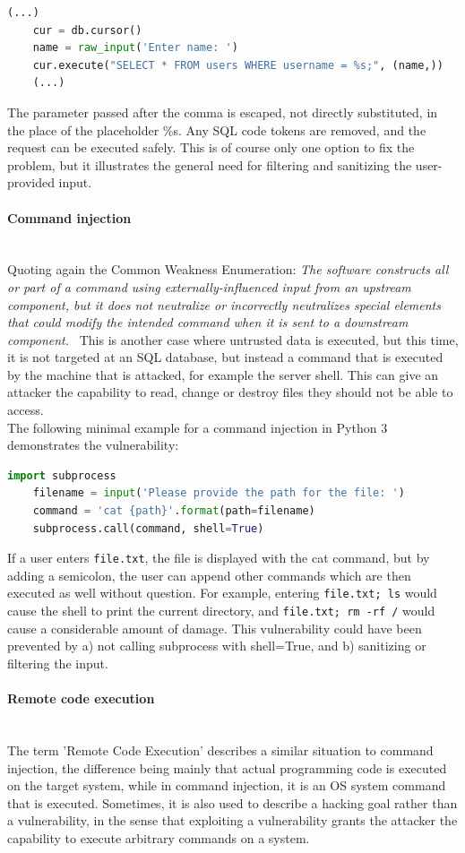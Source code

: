 \documentclass[
a4paper,
pagesize,
pdftex,
12pt,
twoside, %
BCOR=5mm, %
ngerman,
fleqn,
final,
]{scrartcl}
\begin{document}
	\begin{lstlisting}[language=Python,showstringspaces=false]
	(...)
	cur = db.cursor()
	name = raw_input('Enter name: ')
	cur.execute("SELECT * FROM users WHERE username = %s;", (name,))
	(...)
	\end{lstlisting}
	The parameter passed after the comma is escaped, not directly substituted, in the place of the placeholder \%s. Any SQL code tokens are removed, and the request can be executed safely. This is of course only one option to fix the problem, but it illustrates the general need for filtering and sanitizing the user-provided input. 
	
	\paragraph{Command injection}\mbox{}\\
	Quoting again the Common Weakness Enumeration: \textit{The software constructs all or part of a command using externally-influenced input from an upstream component, but it does not neutralize or incorrectly neutralizes special elements that could modify the intended command when it is sent to a downstream component.}~\cite{CommonWeaknessEnumeration.23.9.2019} This is another case where untrusted data is executed, but this time, it is not targeted at an SQL database, but instead a command that is executed by the machine that is attacked, for example the server shell. This can give an attacker the capability to read, change or destroy files they should not be able to access. \\
	The following minimal example for a command injection in Python 3 demonstrates the vulnerability:
	\begin{lstlisting}[language=Python,showstringspaces=false]
	import subprocess
	filename = input('Please provide the path for the file: ')
	command = 'cat {path}'.format(path=filename)
	subprocess.call(command, shell=True)
	\end{lstlisting}
	If a user enters \texttt{file.txt}, the file is displayed with the cat command, but by adding a semicolon, the user can append other commands which are then executed as well without question. For example, entering \texttt{file.txt; ls} would cause the shell to print the current directory, and \texttt{file.txt; rm -rf /} would cause a considerable amount of damage. This vulnerability could have been prevented by a) not calling subprocess with shell=True, and b) sanitizing or filtering the input. 
	
	\paragraph{Remote code execution}\mbox{}\\
	The term 'Remote Code Execution' describes a similar situation to command injection, the difference being mainly that actual programming code is executed on the target system, while in command injection, it is an OS system command that is executed. Sometimes, it is also used to describe a hacking goal rather than a vulnerability, in the sense that exploiting a vulnerability grants the attacker the capability to execute arbitrary commands on a system. 
	
\end{document}
